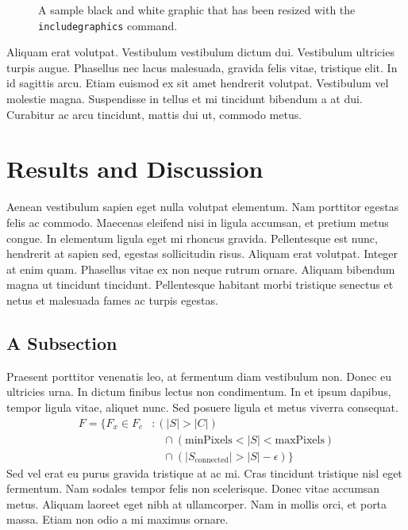 \documentclass[sigconf,review,anonymous]{acmart}
\begin{document}
\begin{figure}[h]
\caption{A sample black and white graphic that has
been resized with the \texttt{includegraphics} command.}
\end{figure}

Aliquam erat volutpat. Vestibulum vestibulum dictum dui. Vestibulum ultricies turpis augue. Phasellus nec lacus malesuada, gravida felis vitae, tristique elit. In id sagittis arcu. Etiam euismod ex sit amet hendrerit volutpat. Vestibulum vel molestie magna. Suspendisse in tellus et mi tincidunt bibendum a at dui. Curabitur ac arcu tincidunt, mattis dui ut, commodo metus.

\section{Results and Discussion}

Aenean vestibulum sapien eget nulla volutpat elementum. Nam porttitor egestas felis ac commodo. Maecenas eleifend nisi in ligula accumsan, et pretium metus congue. In elementum ligula eget mi rhoncus gravida. Pellentesque est nunc, hendrerit at sapien sed, egestas sollicitudin risus. Aliquam erat volutpat. Integer at enim quam. Phasellus vitae ex non neque rutrum ornare. Aliquam bibendum magna ut tincidunt tincidunt. Pellentesque habitant morbi tristique senectus et netus et malesuada fames ac turpis egestas.

\subsection{A Subsection}

Praesent porttitor venenatis leo, at fermentum diam vestibulum non. Donec eu ultricies urna. In dictum finibus lectus non condimentum. In et ipsum dapibus, tempor ligula vitae, aliquet nunc. Sed posuere ligula et metus viverra consequat. 
\begin{equation}
\begin{split}
F = \{F_{x} \in  F_{c} &: (|S| > |C|) \\
 &\quad \cap (\text{minPixels}  < |S| < \text{maxPixels}) \\
 &\quad \cap (|S_{\text{connected}}| > |S| - \epsilon) \}
\end{split}
\end{equation}
Sed vel erat eu purus gravida tristique at ac mi. Cras tincidunt tristique nisl eget fermentum. Nam sodales tempor felis non scelerisque. Donec vitae accumsan metus. Aliquam laoreet eget nibh at ullamcorper. Nam in mollis orci, et porta massa. Etiam non odio a mi maximus ornare.
\end{document}
